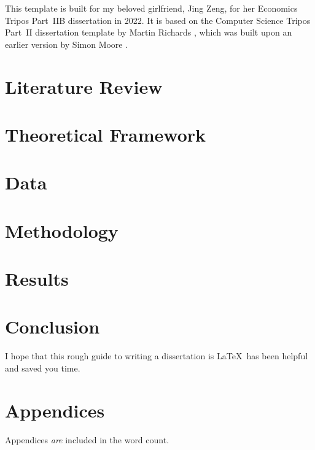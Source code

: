 \documentclass[12pt,a4paper]{article}
\begin{document}
This template is built for my beloved girlfriend, Jing Zeng, for her Economics
Tripos Part~IIB dissertation in 2022. It is based on the Computer Science Tripos
Part~II dissertation template by Martin Richards \citeyearpar{Richards15}, which
was built upon an earlier version by Simon Moore \citeyearpar{Moore95}.


\section{Literature Review}



\section{Theoretical Framework}



\section{Data}



\section{Methodology}



\section{Results}



\section{Conclusion}

I hope that this rough guide to writing a dissertation is \LaTeX\ has been
helpful and saved you time.


\newpage




\newpage
\appendix

\section{Appendices}

Appendices \textit{are} included in the word count.
\end{document}
